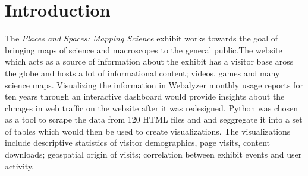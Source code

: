 \section{Introduction} \label{intro}

The \textit{Places and Spaces: Mapping Science} exhibit works towards the goal of bringing maps of science and macroscopes to the general public.The website which acts as a source of information about the exhibit has a visitor base aross the globe and hosts a lot of informational content; videos, games and many science maps. Visualizing the information in Webalyzer monthly usage reports for ten years through an interactive dashboard would provide insights about the chnages in web traffic on the website after it was redesigned. Python was chosen as a tool to scrape the data from 120 HTML files and and seggregate it into a set of tables which would then be used to create visualizations. The visualizations include descriptive statistics of visitor demographics, page visits, content downloads; geospatial origin of visits; correlation between exhibit events and user activity.

